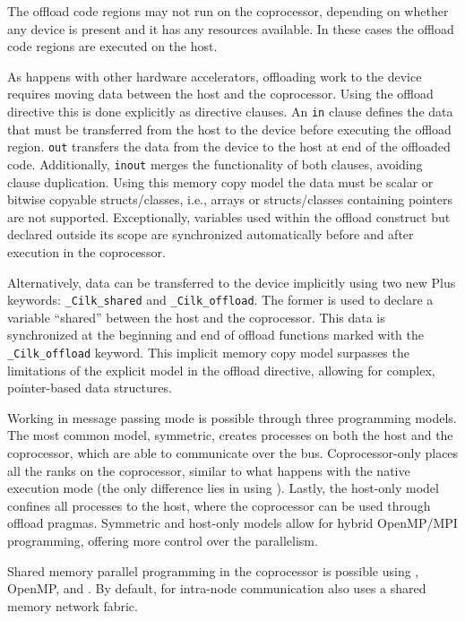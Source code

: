 \documentclass[../thesis]{subfiles}
\begin{document}
	The offload code regions may not run on the coprocessor, depending on whether any device is present and it has any resources available. In these cases the offload code regions are executed on the host.

	As happens with other hardware accelerators, offloading work to the device requires moving data between the host and the coprocessor. Using the offload directive this is done explicitly as directive clauses. An \texttt{in} clause defines the data that must be transferred from the host to the device before executing the offload region. \texttt{out} transfers the data from the device to the host at end of the offloaded code. Additionally, \texttt{inout} merges the functionality of both clauses, avoiding clause duplication. Using this memory copy model the data must be scalar or bitwise copyable structs/classes, i.e., arrays or structs/classes containing pointers are not supported. Exceptionally, variables used within the offload construct but declared outside its scope are synchronized automatically before and after execution in the coprocessor.

	Alternatively, data can be transferred to the device implicitly using two new \intel\cilk Plus keywords: \texttt{\_Cilk\_shared} and \texttt{\_Cilk\_offload}. The former is used to declare a variable ``shared'' between the host and the coprocessor. This data is synchronized at the beginning and end of offload functions marked with the \texttt{\_Cilk\_offload} keyword. This implicit memory copy model surpasses the limitations of the explicit model in the offload directive, allowing for complex, pointer-based data structures.

	Working in message passing mode is possible through three \mpi programming models. The most common model, symmetric, creates \mpi processes on both the host and the coprocessor, which are able to communicate over the \pcie bus. Coprocessor-only places all the \mpi ranks on the coprocessor, similar to what happens with the native execution mode (the only difference lies in using \mpi). Lastly, the host-only model confines all processes to the host, where the coprocessor can be used through offload pragmas. Symmetric and host-only models allow for hybrid OpenMP/MPI programming, offering more control over the parallelism.

	Shared memory parallel programming in the coprocessor is possible using \pthreads, OpenMP, \intel\tbb and \intel\cilk. By default, for intra-node communication \mpi also uses a shared memory network fabric.
\end{document}
